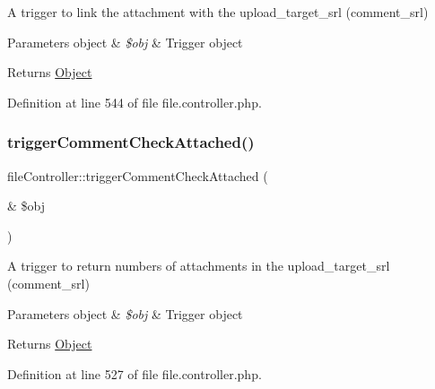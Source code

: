 A trigger to link the attachment with the upload\+\_\+target\+\_\+srl (comment\+\_\+srl)


\begin{DoxyParams}[1]{Parameters}
object & {\em \$obj} & Trigger object \\
\hline
\end{DoxyParams}
\begin{DoxyReturn}{Returns}
\hyperlink{classObject}{Object} 
\end{DoxyReturn}


Definition at line 544 of file file.\+controller.\+php.

\mbox{\label{classfileController_a6076133ce2b8d0c025c54547fbc9cc37}} 
\subsubsection{\texorpdfstring{trigger\+Comment\+Check\+Attached()}{triggerCommentCheckAttached()}}
{\footnotesize\ttfamily file\+Controller\+::trigger\+Comment\+Check\+Attached (\begin{DoxyParamCaption}\item[{\&}]{\$obj }\end{DoxyParamCaption})}

A trigger to return numbers of attachments in the upload\+\_\+target\+\_\+srl (comment\+\_\+srl)


\begin{DoxyParams}[1]{Parameters}
object & {\em \$obj} & Trigger object \\
\hline
\end{DoxyParams}
\begin{DoxyReturn}{Returns}
\hyperlink{classObject}{Object} 
\end{DoxyReturn}


Definition at line 527 of file file.\+controller.\+php.

\mbox{\label{classfileController_ae1011288af2b3a2aca5bc4db41b9ad09}} 
